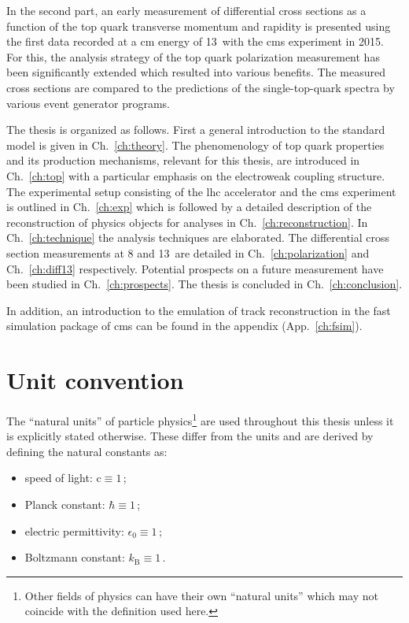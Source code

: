 In the second part, an early measurement of differential cross sections as a function of the top quark transverse momentum and rapidity is presented using the first data recorded at a \acrlong{cm} energy of 13~\TeV with the \gls{cms} experiment in 2015. For this, the analysis strategy of the top quark polarization measurement has been significantly extended which resulted into various benefits. The measured cross sections are compared to the predictions of the single-top-quark spectra by various event generator programs.

The thesis is organized as follows. First a general introduction to the standard model is given in Ch.~\ref{ch:theory}. The phenomenology of top quark properties and its production mechanisms, relevant for this thesis, are introduced in Ch.~\ref{ch:top} with a particular emphasis on the electroweak coupling structure. The experimental setup consisting of the \gls{lhc} accelerator and the \gls{cms} experiment is outlined in Ch.~\ref{ch:exp} which is followed by a detailed description of the reconstruction of physics objects for analyses in Ch.~\ref{ch:reconstruction}. In Ch.~\ref{ch:technique} the analysis techniques are elaborated. The differential cross section measurements at 8 and 13~\TeV are detailed in Ch.~\ref{ch:polarization} and Ch.~\ref{ch:diff13} respectively. Potential prospects on a future measurement have been studied in Ch.~\ref{ch:prospects}. The thesis is concluded in Ch.~\ref{ch:conclusion}.

In addition, an introduction to the emulation of track reconstruction in the fast simulation package of \gls{cms} can be found in the appendix (App.~\ref{ch:fsim}).

\section*{Unit convention}

The ``natural units'' of particle physics\footnote{Other fields of physics can have their own ``natural units'' which may not coincide with the definition used here.} are used throughout this thesis unless it is explicitly stated otherwise. These differ from the  units and are derived by defining the natural constants as:

\begin{itemize}
\item speed of light: $\mathrm{c}\equiv 1$\,;
\item Planck constant: $\hbar\equiv 1$\,;
\item electric permittivity: $\epsilon_{0}\equiv 1$\,;
\item Boltzmann constant: $k_\mathrm{B}\equiv 1$\,.
\end{itemize}

